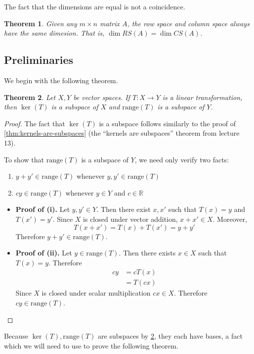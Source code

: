 \documentclass[10pt]{article}
\newtheorem{theorem}{Theorem}
\theoremstyle{definition}
\newcommand{\R}{\mathbb{R}}           %
\newcommand{\range}{\mathrm{range}} %
\begin{document}
The fact that the dimensions are equal is not a coincidence.

\begin{theorem}
  Given any $m\times n$ matrix $A$, the row space and column space always have
  the same dimesion. That is, $\dim RS(A)=\dim CS(A)$.
\end{theorem}

\subsection{Preliminaries}

We begin with the following theorem.
\begin{theorem}
  \label{thm:ker-range-subspace}
  Let $X,Y$ be vector spaces.
  If $T: X \to Y$ is a linear transformation, then $\ker(T)$ is a subspace
  of $X$ and $\range(T)$ is a subspace of $Y$.
\end{theorem}
\begin{proof}
  The fact that $\ker(T)$ is a subspace follows similarly to the proof of
  \cref{thm:kernels-are-subspaces} (the ``kernels are subspaces'' theorem from
  lecture 13).

  To show that $\range(T)$ is a subspace of $Y$, we need only verify two
  facts:
  \begin{enumerate}[label=(\roman*)]
    \item $y+y'\in \range(T)$ whenever $y,y'\in \range(T) $
    \item $cy\in\range(T)$ whenever  $y\in Y$ and $c\in \R$
  \end{enumerate}
  \begin{itemize}
    \item \textbf{Proof of (i).} Let $y,y'\in Y$. Then there exist $x,x'$
    such that $T(x)=y$ and $T(x')=y'$. Since $X$ is closed under vector
    addition, $x+x'\in X$. Moreover,
    \begin{equation*}
      T(x+x')= T(x)+T(x')=y+y'
    \end{equation*}
    Therefore $y+y'\in \range(T)$.
    \item \textbf{Proof of (ii).} Let $y\in \range(T).$ Then there exists $x\in
    X$ such that $T(x)=y$. Therefore
    \begin{align*}
      cy 
      &= cT(x)\\
      &= T(cx)
    \end{align*}
    Since $X$ is closed under scalar multiplication $cx\in X$. Therefore
    $cy\in \range(T)$.
  \end{itemize}
\end{proof}
Because $\ker(T),\range(T)$ are subspaces by \cref{thm:ker-range-subspace},
they each have bases, a fact which we will need to use to prove the following theorem.
\end{document}
